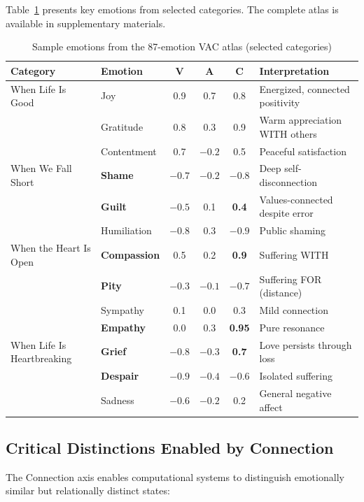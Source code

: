 Table~\ref{tab:atlas-sample} presents key emotions from selected categories. The complete atlas is available in supplementary materials.

\begin{table}[t]
\centering
\caption{Sample emotions from the 87-emotion VAC atlas (selected categories)}
\label{tab:atlas-sample}
\small
\begin{tabular}{llcccp{4cm}}
\toprule
\textbf{Category} & \textbf{Emotion} & \textbf{V} & \textbf{A} & \textbf{C} & \textbf{Interpretation} \\
\midrule
When Life Is Good & Joy & 0.9 & 0.7 & 0.8 & Energized, connected positivity \\
& Gratitude & 0.8 & 0.3 & 0.9 & Warm appreciation WITH others \\
& Contentment & 0.7 & $-0.2$ & 0.5 & Peaceful satisfaction \\
\midrule
When We Fall Short & \textbf{Shame} & $-0.7$ & $-0.2$ & \textbf{$-0.8$} & Deep self-disconnection \\
& \textbf{Guilt} & $-0.5$ & 0.1 & \textbf{0.4} & Values-connected despite error \\
& Humiliation & $-0.8$ & 0.3 & $-0.9$ & Public shaming \\
\midrule
When the Heart Is Open & \textbf{Compassion} & 0.5 & 0.2 & \textbf{0.9} & Suffering WITH \\
& \textbf{Pity} & $-0.3$ & $-0.1$ & \textbf{$-0.7$} & Suffering FOR (distance) \\
& Sympathy & 0.1 & 0.0 & 0.3 & Mild connection \\
& \textbf{Empathy} & 0.0 & 0.3 & \textbf{0.95} & Pure resonance \\
\midrule
When Life Is Heartbreaking & \textbf{Grief} & $-0.8$ & $-0.3$ & \textbf{0.7} & Love persists through loss \\
& \textbf{Despair} & $-0.9$ & $-0.4$ & \textbf{$-0.6$} & Isolated suffering \\
& Sadness & $-0.6$ & $-0.2$ & 0.2 & General negative affect \\
\bottomrule
\end{tabular}
\end{table}

\subsection{Critical Distinctions Enabled by Connection}

The Connection axis enables computational systems to distinguish emotionally similar but relationally distinct states:

